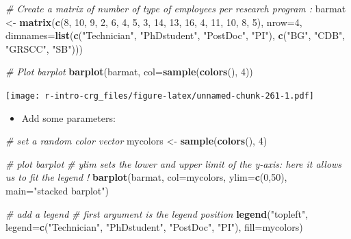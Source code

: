 \documentclass[]{book}
\newenvironment{Shaded}{\begin{snugshade}}{\end{snugshade}}
\newcommand{\CommentTok}[1]{\textcolor[rgb]{0.56,0.35,0.01}{\textit{#1}}}
\newcommand{\DataTypeTok}[1]{\textcolor[rgb]{0.13,0.29,0.53}{#1}}
\newcommand{\DecValTok}[1]{\textcolor[rgb]{0.00,0.00,0.81}{#1}}
\newcommand{\KeywordTok}[1]{\textcolor[rgb]{0.13,0.29,0.53}{\textbf{#1}}}
\newcommand{\NormalTok}[1]{#1}
\newcommand{\StringTok}[1]{\textcolor[rgb]{0.31,0.60,0.02}{#1}}
\providecommand{\tightlist}{%
  \setlength{\itemsep}{0pt}\setlength{\parskip}{0pt}}
\begin{document}
\begin{Shaded}
\begin{Highlighting}[]
\CommentTok{# Create a matrix of number of type of employees per research program :}
\NormalTok{barmat <-}\StringTok{ }\KeywordTok{matrix}\NormalTok{(}\KeywordTok{c}\NormalTok{(}\DecValTok{8}\NormalTok{, }\DecValTok{10}\NormalTok{, }\DecValTok{9}\NormalTok{, }\DecValTok{2}\NormalTok{, }\DecValTok{6}\NormalTok{, }\DecValTok{4}\NormalTok{, }\DecValTok{5}\NormalTok{, }\DecValTok{3}\NormalTok{, }\DecValTok{14}\NormalTok{, }\DecValTok{13}\NormalTok{, }\DecValTok{16}\NormalTok{, }\DecValTok{4}\NormalTok{, }\DecValTok{11}\NormalTok{, }\DecValTok{10}\NormalTok{, }\DecValTok{8}\NormalTok{, }\DecValTok{5}\NormalTok{),}
    \DataTypeTok{nrow=}\DecValTok{4}\NormalTok{,}
    \DataTypeTok{dimnames=}\KeywordTok{list}\NormalTok{(}\KeywordTok{c}\NormalTok{(}\StringTok{"Technician"}\NormalTok{, }\StringTok{"PhDstudent"}\NormalTok{, }\StringTok{"PostDoc"}\NormalTok{, }\StringTok{"PI"}\NormalTok{), }\KeywordTok{c}\NormalTok{(}\StringTok{"BG"}\NormalTok{, }\StringTok{"CDB"}\NormalTok{, }\StringTok{"GRSCC"}\NormalTok{, }\StringTok{"SB"}\NormalTok{)))}

\CommentTok{# Plot barplot}
\KeywordTok{barplot}\NormalTok{(barmat, }\DataTypeTok{col=}\KeywordTok{sample}\NormalTok{(}\KeywordTok{colors}\NormalTok{(), }\DecValTok{4}\NormalTok{))}
\end{Highlighting}
\end{Shaded}

\texttt{[image: r-intro-crg\_files/figure-latex/unnamed-chunk-261-1.pdf]}

\begin{itemize}
\tightlist
\item
  Add some parameters:
\end{itemize}

\begin{Shaded}
\begin{Highlighting}[]
\CommentTok{# set a random color vector}
\NormalTok{mycolors <-}\StringTok{ }\KeywordTok{sample}\NormalTok{(}\KeywordTok{colors}\NormalTok{(), }\DecValTok{4}\NormalTok{)}

\CommentTok{# plot barplot}
\CommentTok{# ylim sets the lower and upper limit of the y-axis: here it allows us to fit the legend !}
\KeywordTok{barplot}\NormalTok{(barmat, }
    \DataTypeTok{col=}\NormalTok{mycolors, }
    \DataTypeTok{ylim=}\KeywordTok{c}\NormalTok{(}\DecValTok{0}\NormalTok{,}\DecValTok{50}\NormalTok{),}
    \DataTypeTok{main=}\StringTok{"stacked barplot"}\NormalTok{)}

\CommentTok{# add a legend}
\CommentTok{# first argument is the legend position}
\KeywordTok{legend}\NormalTok{(}\StringTok{"topleft"}\NormalTok{, }
    \DataTypeTok{legend=}\KeywordTok{c}\NormalTok{(}\StringTok{"Technician"}\NormalTok{, }\StringTok{"PhDstudent"}\NormalTok{, }\StringTok{"PostDoc"}\NormalTok{, }\StringTok{"PI"}\NormalTok{),}
    \DataTypeTok{fill=}\NormalTok{mycolors)}
\end{Highlighting}
\end{Shaded}
\end{document}
